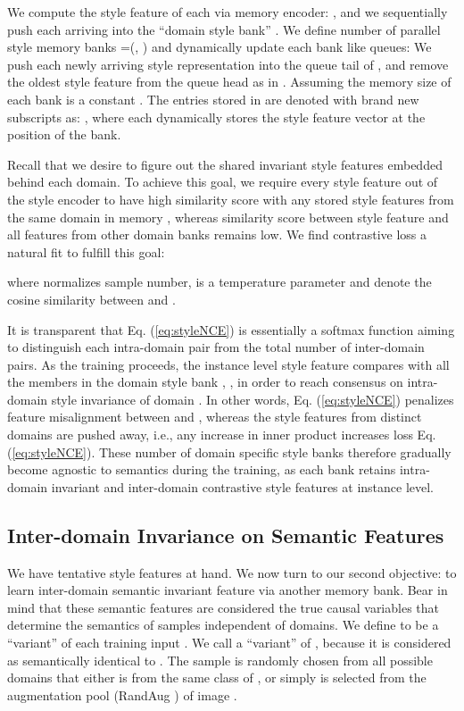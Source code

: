 \documentclass[10pt,twocolumn,letterpaper]{article}
\newcommand{\0}{{\bf 0}}
\begin{document}
We compute the style feature of each  via memory encoder: , and we sequentially push each arriving  into the ``domain style bank'' . We define  number of parallel style memory banks =(, ) and dynamically update each  bank like queues: We push each newly arriving style representation  into the queue tail of , and remove the oldest style feature from the queue head as in \cite{he2020momentum}. Assuming the memory size of each bank  is a constant . The entries stored in  are denoted with brand new subscripts as: , where each  dynamically stores the style feature vector  at the  position of the  bank.

Recall that we desire to figure out the shared invariant style features embedded behind each domain. To achieve this goal, we require every style feature out of the style encoder  to have high similarity score with any stored style features from the same domain in memory , whereas similarity score between style feature  and all features from other domain banks  remains low. We find contrastive loss \cite{he2020momentum,tian2019contrastive} a natural fit to fulfill this goal:

where  normalizes sample number,  is a temperature parameter and  denote the cosine similarity between  and .

It is transparent that Eq. (\ref{eq:styleNCE}) is essentially a softmax function aiming to distinguish each  intra-domain pair from the total  number of  inter-domain pairs. As the training proceeds, the instance level style feature  compares with all the members in the domain style bank , , in order to reach consensus on intra-domain style invariance of domain . In other words, Eq. (\ref{eq:styleNCE}) penalizes feature misalignment between  and , whereas the style features from distinct domains are pushed away, i.e., any increase in inner product  increases loss Eq. (\ref{eq:styleNCE}). These  number of domain specific style banks therefore gradually become agnostic to semantics during the training, as each bank  retains intra-domain invariant and inter-domain contrastive style features at instance level.

\subsection{Inter-domain Invariance on Semantic Features}\label{sec:intersemantic}
We have tentative style features at hand. We now turn to our second objective: to learn inter-domain semantic invariant feature via another memory bank. Bear in mind that these semantic features are considered the true causal variables that determine the semantics of samples independent of domains. We define  to be a ``variant'' of each training input . We call  a ``variant'' of , because it is considered as semantically identical to . The sample  is randomly chosen from all possible  domains that either is from the same class of , or simply is selected from the augmentation pool (RandAug \cite{cubuk2020randaugment}) of image .
\end{document}

